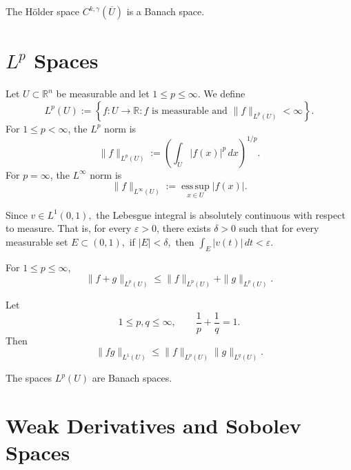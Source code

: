 \begin{theorem}
The Hölder space
$
C^{k,\gamma}(\overline{U})
$
is a Banach space.
\end{theorem}










\section{$L^p$ Spaces}

\begin{definition}
Let $U\subset \mathbb{R}^n$ be measurable and let
$
1\le p\le \infty.
$
We define
$$
L^p(U)
:=
\left\{
f:U\to \mathbb{R}:
f \text{ is measurable and } \|f\|_{L^p(U)}<\infty
\right\}.
$$
For $1\le p<\infty$, the $L^p$ norm is
$$
\|f\|_{L^p(U)}
:=
\left(
\int_U |f(x)|^p\,dx
\right)^{1/p}.
$$
For $p=\infty$, the $L^\infty$ norm is
$$
\|f\|_{L^\infty(U)}
:=
\operatorname*{ess\,sup}_{x\in U}|f(x)|.
$$
\end{definition}

\begin{theorem}
Since
$
v\in L^1(0,1),
$
the Lebesgue integral is absolutely continuous with respect to measure. That is, for every $\varepsilon>0$, there exists $\delta>0$ such that for every measurable set
$
E\subset (0,1),
$
if
$
|E|<\delta,
$
then
$
\int_E |v(t)|\,dt<\varepsilon.
$
\end{theorem}

\begin{theorem}
For $1\le p\le \infty$,
$$
\|f+g\|_{L^p(U)}
\le
\|f\|_{L^p(U)}+\|g\|_{L^p(U)}.
$$
\end{theorem}

\begin{theorem}
Let
$$
1\le p,q\le \infty,
\qquad
\frac{1}{p}+\frac{1}{q}=1.
$$
Then
$$
\|fg\|_{L^1(U)}
\le
\|f\|_{L^p(U)}\|g\|_{L^q(U)}.
$$
\end{theorem}

\begin{theorem}
The spaces $L^p(U)$ are Banach spaces.
\end{theorem}











\section{Weak Derivatives and Sobolev Spaces}

